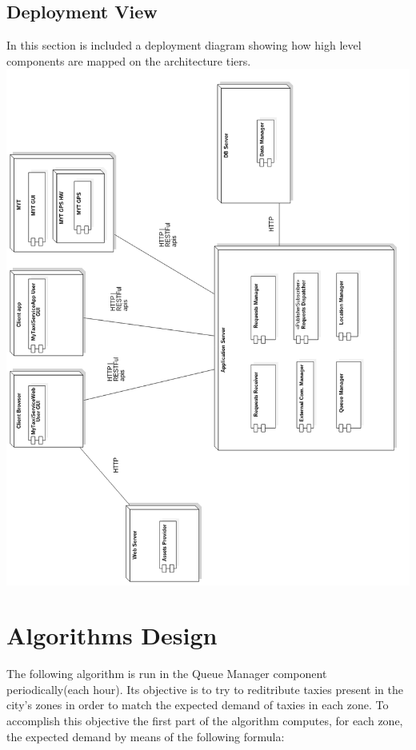 \documentclass[11pt,titlepage]{article} %
\begin{document}
\subsection{Deployment View}
In this section is included a deployment diagram showing how high level components are mapped on the architecture tiers.\newline
\includegraphics[scale=0.4]{deployment.png}

\newpage

\section{Algorithms Design}
The following algorithm is run in the Queue Manager component periodically(each hour).
  Its objective is to try to reditribute taxies present in the city's zones in order
  to match the expected demand of taxies in each zone.
  To accomplish this objective the first part of the algorithm computes, for each zone,
  the expected demand by means of the following formula:\newline
\end{document}
